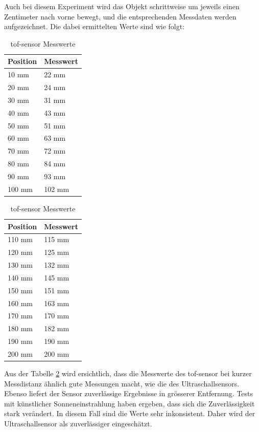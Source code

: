 \documentclass[../main.tex]{subfiles}
\begin{document}
Auch bei diesem Experiment wird das Objekt schrittweise um jeweils einen Zentimeter nach vorne bewegt, und die entsprechenden Messdaten werden aufgezeichnet. Die dabei ermittelten Werte sind wie folgt:
\begin{table}[H]
\centering
\begin{minipage}{0.45\textwidth}
\centering
\begin{tabular}{@{}ll@{}}
\toprule
\textbf{Position} & \textbf{Messwert} \\
\midrule
10 mm  & 22 mm  \\
20 mm  & 24 mm  \\
30 mm  & 31 mm  \\
40 mm  & 43 mm  \\
50 mm  & 51 mm  \\
60 mm  & 63 mm  \\
70 mm  & 72 mm  \\
80 mm  & 84 mm  \\
90 mm  & 93 mm  \\
100 mm & 102 mm \\
\bottomrule
\end{tabular}
\end{minipage}%
\hspace{0.05\textwidth} %
\begin{minipage}{0.45\textwidth}
\centering
\begin{tabular}{@{}ll@{}}
\toprule
\textbf{Position} & \textbf{Messwert} \\
\midrule
110 mm & 115 mm \\
120 mm & 125 mm \\
130 mm & 132 mm \\
140 mm & 145 mm \\
150 mm & 151 mm \\
160 mm & 163 mm \\
170 mm & 170 mm \\
180 mm & 182 mm \\
190 mm & 190 mm \\
200 mm & 200 mm \\
\bottomrule
\end{tabular}
\end{minipage}
\caption{\acrshort{tof-sensor} Messwerte}
\label{tab:TOFMD}
\end{table}

Aus der Tabelle \ref{tab:TOFMD} wird ersichtlich, dass die Messwerte des \acrshort{tof-sensor} bei kurzer Messdistanz ähnlich gute Messungen macht, wie die des Ultraschallsensors. Ebenso liefert der Sensor zuverlässige Ergebnisse in grösserer Entfernung. Tests mit künstlicher Sonneneinstrahlung haben ergeben, dass sich die Zuverlässigkeit stark verändert. In diesem Fall sind die Werte sehr inkonsistent. Daher wird der Ultraschallsensor als zuverlässiger eingeschätzt.
\end{document}
